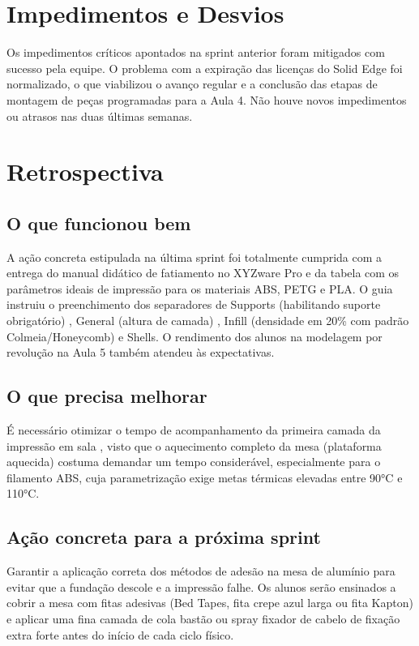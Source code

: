 \documentclass[12pt,a4paper]{article}
\begin{document}
\section{Impedimentos e Desvios}
Os impedimentos críticos apontados na sprint anterior foram mitigados com sucesso pela equipe. O problema com a expiração das licenças do Solid Edge foi normalizado, o que viabilizou o avanço regular e a conclusão das etapas de montagem de peças programadas para a Aula 4. Não houve novos impedimentos ou atrasos nas duas últimas semanas.

\section{Retrospectiva}
\subsection*{O que funcionou bem}
A ação concreta estipulada na última sprint foi totalmente cumprida com a entrega do manual didático de fatiamento no XYZware Pro e da tabela com os parâmetros ideais de impressão para os materiais ABS, PETG e PLA. O guia instruiu o preenchimento dos separadores de Supports (habilitando suporte obrigatório) , General (altura de camada) , Infill (densidade em 20\% com padrão Colmeia/Honeycomb) e Shells. O rendimento dos alunos na modelagem por revolução na Aula 5 também atendeu às expectativas. 

\subsection*{O que precisa melhorar}
É necessário otimizar o tempo de acompanhamento da primeira camada da impressão em sala , visto que o aquecimento completo da mesa (plataforma aquecida) costuma demandar um tempo considerável, especialmente para o filamento ABS, cuja parametrização exige metas térmicas elevadas entre 90°C e 110°C. 

\subsection*{Ação concreta para a próxima sprint}
Garantir a aplicação correta dos métodos de adesão na mesa de alumínio para evitar que a fundação descole e a impressão falhe. Os alunos serão ensinados a cobrir a mesa com fitas adesivas (Bed Tapes, fita crepe azul larga ou fita Kapton) e aplicar uma fina camada de cola bastão ou spray fixador de cabelo de fixação extra forte antes do início de cada ciclo físico. 
\end{document}
